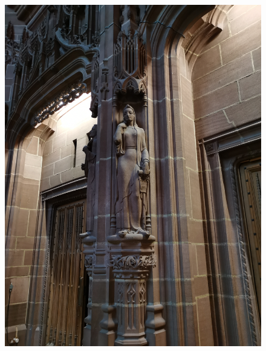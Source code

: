 \documentclass[11pt]{article}
\begin{document}
\begin{figure}[H]
    \centering
    \includegraphics[width=\textwidth]{1O.jpg}
\end{figure}
\end{document}
